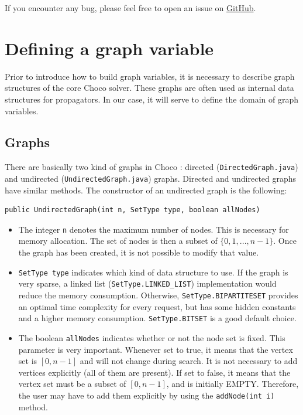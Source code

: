 \documentclass{article}
\begin{document}
If you encounter any bug, please feel free to open an issue on \href{https://github.com/chocoteam/choco-graph/}{GitHub}.

\newpage{}
\section{Defining a graph variable}

Prior to introduce how to build graph variables, it is necessary to describe graph structures of the core Choco solver. These graphs are often used as internal data structures for propagators. In our case, it will serve to define the domain of graph variables. 

\subsection{Graphs}

There are basically two kind of graphs in Choco : directed (\texttt{DirectedGraph.java}) and undirected (\texttt{UndirectedGraph.java}) graphs. 
Directed and undirected graphs have similar methods. The constructor of an undirected graph is the following: 
\begin{lstlisting}
public UndirectedGraph(int n, SetType type, boolean allNodes)
\end{lstlisting}

\begin{itemize}
\item The integer \texttt{n} denotes the maximum number of nodes. This is necessary for memory allocation. The set of nodes is then a subset of $\{0,1,...,n-1\}$. Once the graph has been created, it is not possible to modify that value. 
\item \texttt{SetType type} indicates which kind of data structure to use. If the graph is very sparse, a linked list (\texttt{SetType.LINKED\_LIST}) implementation would reduce the memory consumption. Otherwise, \texttt{SetType.BIPARTITESET} provides an optimal time complexity for every request, but has some hidden constants and a higher memory consumption. \texttt{SetType.BITSET} is a good default choice. 
\item The boolean \texttt{allNodes} indicates whether or not the node set is fixed. This parameter is very important. Whenever set to true, it means that the vertex set is $[0,n-1]$ and will not change during search. It is not necessary to add vertices explicitly (all of them are present). If set to false, it means that the vertex set must be a subset of $[0,n-1]$, and is initially EMPTY. Therefore, the user may have to add them explicitly by using the \texttt{addNode(int i)} method.
\end{itemize}
\end{document}
